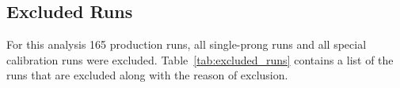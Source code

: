 \subsection{Excluded Runs}\label{sec:analysis.excluded}

For this analysis 165 production runs, all single-prong runs and all special calibration runs were excluded. Table~\ref{tab:excluded_runs} contains a list of the runs that are excluded along with the reason of exclusion.



